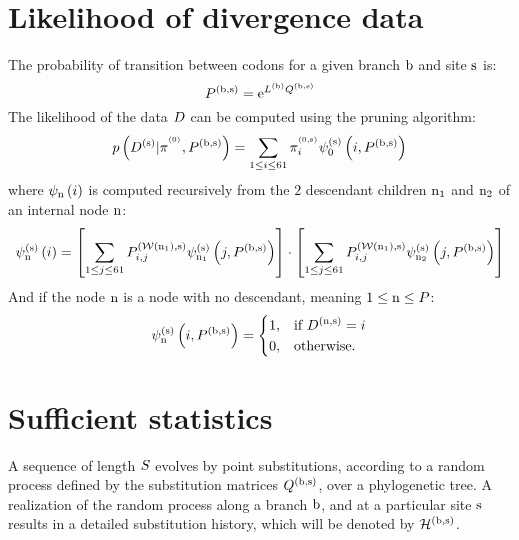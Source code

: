 \section{Likelihood of divergence data}
The probability of transition between codons for a given branch $\text{b}$ and site $\text{s}$ is:
\begin{equation}
P^{(\text{b}, \text{s})} = \mathrm{e}^{L^{(\text{b})} Q^{(\text{b}, \text{s})}}
\end{equation}
The likelihood of the data $D$ can be computed using the pruning algorithm:
\begin{equation}
p\left(D^{(\text{s})}|\pi^{^{(0)}}, P^{(\text{b}, \text{s})} \right) = \sum_{1 \leq {i} \leq 61 } \pi_{{i}}^{^{(0, \text{s})}} \psi^{(\text{s})}_{0} \left( {i}, P^{(\text{b}, \text{s})} \right)
\end{equation}
where $\psi_{\text{n}} \left( {i} \right)$ is computed recursively from the $2$  descendant children $\text{n}_{1}$ and $\text{n}_{2}$ of an internal node $\text{n}$:
\begin{equation}
\psi^{(\text{s})}_{\text{n}} \left( {i} \right) = \left[ \sum_{1 \leq {j} \leq 61} P^{(\mathcal{W}\left(\text{n}_{1}\right), \text{s})}_{{i}, {j}} \psi^{(\text{s})}_{\text{n}_{1}} \left( {j}, P^{(\text{b}, \text{s})} \right) \right] \cdot \left[ \sum_{1 \leq {j} \leq 61} P^{(\mathcal{W}\left(\text{n}_{1}\right), \text{s})}_{{i}, {j}} \psi^{(\text{s})}_{\text{n}_{2}} \left( {j}, P^{(\text{b}, \text{s})} \right) \right]
\end{equation}
And if the node $\text{n}$ is a node with no descendant, meaning $1 \leq \text{n} \leq P$:
\begin{equation}
\psi^{(\text{s})}_{\text{n}}\left( {i}, P^{(\text{b}, \text{s})} \right) =
\begin{dcases}
1, & \text{if }D^{(\text{n}, \text{s})} =  {i} \\
0, & \text{otherwise.}
\end{dcases}
\end{equation}

\section{Sufficient statistics}
A sequence of length $S$ evolves by point substitutions, according to a random process defined by the substitution matrices $Q^{(\text{b}, \text{s})}$, over a phylogenetic tree.
A realization of the random process along a branch $\text{b}$, and at a particular site $\text{s}$ results in a detailed substitution history, which will be denoted by $\mathcal{H}^{(\text{b}, \text{s})}$.

